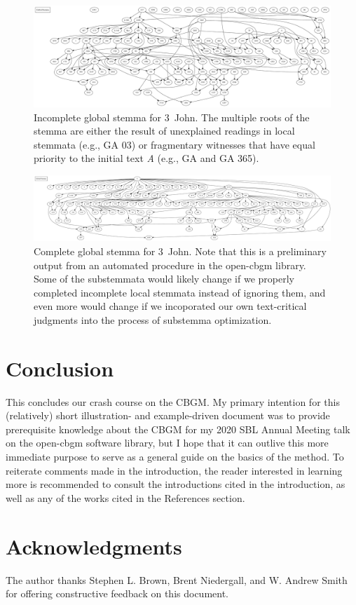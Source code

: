 \documentclass[a4paper, 12pt]{article}
\begin{document}
	\begin{figure}
		\centering
		\includegraphics[width=\textwidth]{../graphics/global-stemma-incomplete.pdf}
		\caption{Incomplete global stemma for 3~John. The multiple roots of the stemma are either the result of unexplained readings in local stemmata (e.g., GA 03) or fragmentary witnesses that have equal priority to the initial text \emph{A} (e.g., GA  and GA 365).}
		\label{fig:global-stemma-incomplete}
	\end{figure}
	
	\begin{figure}
		\centering
		\includegraphics[width=\textwidth]{../graphics/global-stemma.pdf}
		\caption{Complete global stemma for 3~John. Note that this is a preliminary output from an automated procedure in the \textsf{open-cbgm} library. Some of the substemmata would likely change if we properly completed incomplete local stemmata instead of ignoring them, and even more would change if we incoporated our own text-critical judgments into the process of substemma optimization.}
		\label{fig:global-stemma}
	\end{figure}
	
	\newpage
	
	\section*{Conclusion}\label{sec:conclusion}
	This concludes our crash course on the CBGM. My primary intention for this (relatively) short illustration- and example-driven document was to provide prerequisite knowledge about the CBGM for my 2020 SBL Annual Meeting talk on the \textsf{open-cbgm} software library, but I hope that it can outlive this more immediate purpose to serve as a general guide on the basics of the method. To reiterate comments made in the introduction, the reader interested in learning more is recommended to consult the introductions cited in the introduction, as well as any of the works cited in the References section.
	
	\section*{Acknowledgments}\label{sec:acknowledgments}
	The author thanks Stephen L. Brown, Brent Niedergall, and W. Andrew Smith for offering constructive feedback on this document.
	
	\printbibliography
\end{document}
